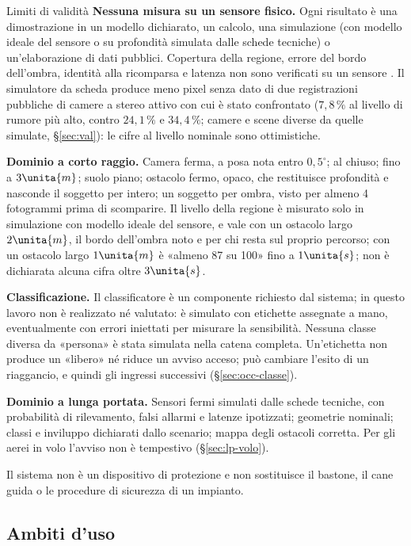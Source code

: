 \begin{riquadro}{Limiti di validità}
\textbf{Nessuna misura su un sensore fisico.} Ogni risultato è una dimostrazione in un modello dichiarato, un calcolo, una simulazione (con modello ideale del sensore o su profondità simulata dalle schede tecniche) o un'elaborazione di dati pubblici. Copertura della regione, errore del bordo dell'ombra, identità alla ricomparsa e latenza non sono verificati su un sensore . Il simulatore da scheda produce meno pixel senza dato di due registrazioni pubbliche di camere a stereo attivo con cui è stato confrontato ($7{,}8\,\%$ al livello di rumore più alto, contro $24{,}1\,\%$ e $34{,}4\,\%$; camere e scene diverse da quelle simulate, \S\ref{sec:val}): le cifre al livello nominale sono ottimistiche.

\textbf{Dominio a corto raggio.} Camera ferma, a posa nota entro $0{,}5^\circ$; al chiuso; fino a $3\unita{m}$; suolo piano; ostacolo fermo, opaco, che restituisce profondità e nasconde il soggetto per intero; un soggetto per ombra, visto per almeno 4 fotogrammi prima di scomparire. Il livello della regione è misurato solo in simulazione con modello ideale del sensore, e vale con un ostacolo largo $2\unita{m}$, il bordo dell'ombra noto e per chi resta sul proprio percorso; con un ostacolo largo $1\unita{m}$ è «almeno 87 su 100» fino a $1\unita{s}$; non è dichiarata alcuna cifra oltre $3\unita{s}$.

\textbf{Classificazione.} Il classificatore è un componente richiesto dal sistema; in questo lavoro non è realizzato né valutato: è simulato con etichette assegnate a mano, eventualmente con errori iniettati per misurare la sensibilità. Nessuna classe diversa da «persona» è stata simulata nella catena completa. Un'etichetta non produce un «libero» né riduce un avviso acceso; può cambiare l'esito di un riaggancio, e quindi gli ingressi successivi (\S\ref{sec:occ-classe}).

\textbf{Dominio a lunga portata.} Sensori fermi simulati dalle schede tecniche, con probabilità di rilevamento, falsi allarmi e latenze ipotizzati; geometrie nominali; classi e inviluppo dichiarati dallo scenario; mappa degli ostacoli corretta. Per gli aerei in volo l'avviso non è tempestivo (\S\ref{sec:lp-volo}).

Il sistema non è un dispositivo di protezione e non sostituisce il bastone, il cane guida o le procedure di sicurezza di un impianto.
\end{riquadro}

\subsection{Ambiti d'uso}\label{sec:intro-ambiti}

